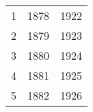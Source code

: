 % 
\begin{tabular}{ccc}
  \hline
  \hline
1 & 1878 & 1922 \\ 
  2 & 1879 & 1923 \\ 
  3 & 1880 & 1924 \\ 
  4 & 1881 & 1925 \\ 
  5 & 1882 & 1926 \\ 
   \hline
\end{tabular}
